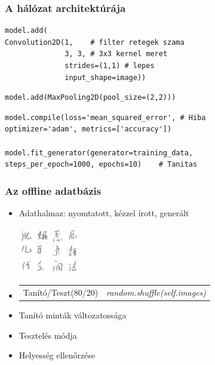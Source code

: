 \documentclass{beamer}
\begin{document}
\begin{frame}[fragile]
\frametitle{A hálózat architektúrája}

\begin{lstlisting}
model.add(
Convolution2D(1,	# filter retegek szama    
              3, 3,	# 3x3 kernel meret 
              strides=(1,1) # lepes
              input_shape=image))
\end{lstlisting}
\begin{lstlisting}
model.add(MaxPooling2D(pool_size=(2,2)))
\end{lstlisting}
\begin{lstlisting}
model.compile(loss='mean_squared_error', # Hiba
optimizer='adam', metrics=['accuracy'])

model.fit_generator(generator=training_data,
steps_per_epoch=1000, epochs=10)	# Tanitas
\end{lstlisting}

\end{frame}


\begin{frame}[fragile]
\frametitle{Az offline adatbázis}

\begin{itemize}
\item Adathalmaz: nyomtatott, kézzel írott, generált

\includegraphics[scale=1.0, center]{offline_dataset4x3}
\item \begin{tabular}{l r}
Tanító/Teszt(80/20) & \textit{random.shuffle(self.images)}
\end{tabular}
\item Tanító minták változatossága
\item Tesztelés módja
\item Helyesség ellenőrzése
\end{itemize}

\end{frame}
\end{document}
